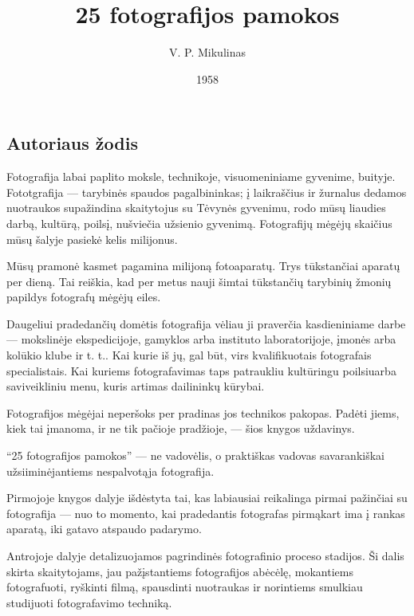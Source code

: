 \documentclass{book}
\title{25 fotografijos pamokos}
\author{V. P. Mikulinas}
\date{1958}
\begin{document}
	\clearpage
	\thispagestyle{empty}

	\maketitle

	\pagebreak
	\cleardoublepage
	\chapter*{}
	\section*{Autoriaus žodis}
		Fotografija labai paplito moksle, technikoje, visuomeniniame gyvenime, buityje. Fototgrafija --- tarybinės spaudos pagalbininkas; į laikraščius ir žurnalus dedamos nuotraukos supažindina skaitytojus su Tėvynės gyvenimu, rodo mūsų liaudies darbą, kultūrą, poilsį, nušviečia užsienio gyvenimą. Fotografijų mėgėjų skaičius mūsų šalyje pasiekė kelis milijonus.

		Mūsų pramonė kasmet pagamina milijoną fotoaparatų. Trys tūkstančiai aparatų per dieną. Tai reiškia, kad per metus nauji šimtai tūkstančių tarybinių žmonių papildys fotografų mėgėjų eiles.

		Daugeliui pradedančių domėtis fotografija vėliau ji praverčia kasdieniniame darbe --- mokslinėje ekspedicijoje, gamyklos arba instituto laboratorijoje, įmonės arba kolūkio klube ir t. t.. Kai kurie iš jų, gal būt, virs kvalifikuotais fotografais specialistais. Kai kuriems fotografavimas taps patraukliu kultūringu poilsiuarba saviveikliniu menu, kuris artimas dailininkų kūrybai.

		Fotografijos mėgėjai neperšoks per pradinas jos technikos pakopas. Padėti jiems, kiek tai įmanoma, ir ne tik pačioje pradžioje, --- šios knygos uždavinys.

		``25 fotografijos pamokos''  --- ne vadovėlis, o praktiškas vadovas savarankiškai užsiiminėjantiems nespalvotąja fotografija.

		Pirmojoje knygos dalyje išdėstyta tai, kas labiausiai reikalinga pirmai pažinčiai su fotografija --- nuo to momento, kai pradedantis fotografas pirmąkart ima į rankas aparatą, iki gatavo atspaudo padarymo.

		Antrojoje dalyje detalizuojamos pagrindinės fotografinio proceso stadijos. Ši dalis skirta skaitytojams, jau pažįstantiems fotografijos abėcėlę, mokantiems fotografuoti, ryškinti filmą, spausdinti nuotraukas ir norintiems smulkiau studijuoti fotografavimo techniką.
\end{document}
